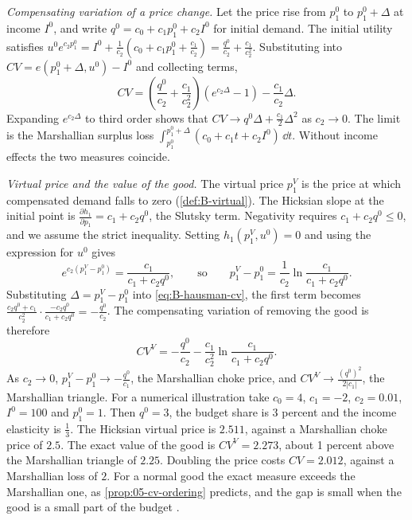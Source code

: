 \begin{example}
\textit{Compensating variation of a price change.} Let the price rise from $p_1^0$ to $p_1^0 + \Delta$ at income
$I^0$, and write $q^0 = c_0 + c_1p_1^0 + c_2I^0$ for initial demand. The initial utility satisfies
$u^0e^{c_2p_1^0} = I^0 + \frac{1}{c_2}\left(c_0 + c_1p_1^0 + \frac{c_1}{c_2}\right) = \frac{q^0}{c_2} + \frac{c_1}{c_2^2}$.
Substituting into $CV = e(p_1^0 + \Delta, u^0) - I^0$ and collecting terms,
\begin{equation}\label{eq:B-hausman-cv}
CV = \left(\frac{q^0}{c_2} + \frac{c_1}{c_2^2}\right)\left(e^{c_2\Delta} - 1\right) - \frac{c_1}{c_2}\Delta .
\end{equation}
Expanding $e^{c_2\Delta}$ to third order shows that $CV \to q^0\Delta + \frac{c_1}{2}\Delta^2$ as $c_2 \to 0$. The
limit is the Marshallian surplus loss $\int_{p_1^0}^{p_1^0 + \Delta}(c_0 + c_1t + c_2I^0)\,\dd t$. Without income
effects the two measures coincide.

\textit{Virtual price and the value of the good.} The virtual price $p_1^V$ is the price at which compensated
demand falls to zero (\cref{def:B-virtual}). The Hicksian slope at the initial point is
$\frac{\partial h_1}{\partial p_1} = c_1 + c_2q^0$, the Slutsky term. Negativity requires $c_1 + c_2q^0 \leq 0$, and we
assume the strict inequality. Setting
$h_1(p_1^V, u^0) = 0$ and using the expression for $u^0$ gives
\begin{equation*}
e^{c_2(p_1^V - p_1^0)} = \frac{c_1}{c_1 + c_2q^0},
\qquad\text{so}\qquad
p_1^V - p_1^0 = \frac{1}{c_2}\ln\frac{c_1}{c_1 + c_2q^0} .
\end{equation*}
Substituting $\Delta = p_1^V - p_1^0$ into \eqref{eq:B-hausman-cv}, the first term becomes
$\frac{c_2q^0 + c_1}{c_2^2}\cdot\frac{-c_2q^0}{c_1 + c_2q^0} = -\frac{q^0}{c_2}$. The compensating variation of
removing the good is therefore
\begin{equation*}
CV^V = -\frac{q^0}{c_2} - \frac{c_1}{c_2^2}\ln\frac{c_1}{c_1 + c_2q^0} .
\end{equation*}
As $c_2 \to 0$, $p_1^V - p_1^0 \to -\frac{q^0}{c_1}$, the Marshallian choke price, and $CV^V \to \frac{(q^0)^2}{2|c_1|}$,
the Marshallian triangle. For a numerical illustration take $c_0 = 4$, $c_1 = -2$, $c_2 = 0.01$, $I^0 = 100$
and $p_1^0 = 1$. Then $q^0 = 3$, the budget share is 3 percent and the income elasticity is $\frac{1}{3}$. The
Hicksian virtual price is $2.511$, against a Marshallian choke price of $2.5$. The exact value of the good
is $CV^V = 2.273$, about 1 percent above the Marshallian triangle of $2.25$. Doubling the price costs
$CV = 2.012$, against a Marshallian loss of $2$. For a normal good the exact measure exceeds the Marshallian
one, as \cref{prop:05-cv-ordering} predicts, and the gap is small when the good is a small part of the
budget \citep{Willig1976}.
\end{example}

